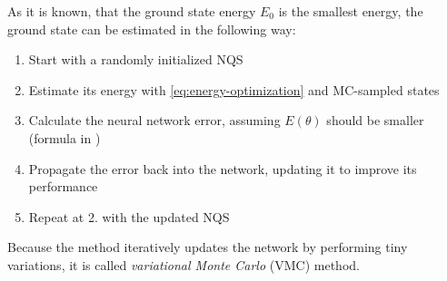 As it is known, that the ground state energy $E_0$ is the smallest energy, the ground state can be estimated in the following way:
\begin{enumerate}
    \setlength\itemsep{-0.5em}
    \item Start with a randomly initialized NQS
    \item Estimate its energy with \autoref{eq:energy-optimization} and MC-sampled states
    \item Calculate the neural network error, assuming $E(\theta)$ should be smaller (formula in \cite{jVMCPaper})
    \item Propagate the error back into the network, updating it to improve its performance
    \item Repeat at 2. with the updated NQS
\end{enumerate}

Because the method iteratively updates the network by performing tiny variations, it is called \emph{variational Monte Carlo} (VMC) method.
